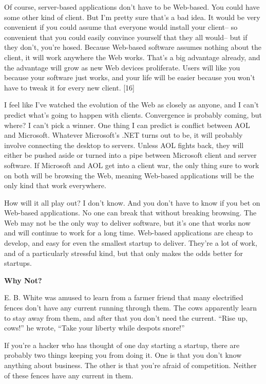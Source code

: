 Of course, server-based applications don't have to be Web-based. You
could have some other kind of client. But I'm pretty sure that's a bad
idea. It would be very convenient if you could assume that everyone
would install your client-- so convenient that you could easily convince
yourself that they all would-- but if they don't, you're hosed. Because
Web-based software assumes nothing about the client, it will work
anywhere the Web works. That's a big advantage already, and the
advantage will grow as new Web devices proliferate. Users will like you
because your software just works, and your life will be easier because
you won't have to tweak it for every new client. {[}16{]}

I feel like I've watched the evolution of the Web as closely as anyone,
and I can't predict what's going to happen with clients. Convergence is
probably coming, but where? I can't pick a winner. One thing I can
predict is conflict between AOL and Microsoft. Whatever Microsoft's .NET
turns out to be, it will probably involve connecting the desktop to
servers. Unless AOL fights back, they will either be pushed aside or
turned into a pipe between Microsoft client and server software. If
Microsoft and AOL get into a client war, the only thing sure to work on
both will be browsing the Web, meaning Web-based applications will be
the only kind that work everywhere.

How will it all play out? I don't know. And you don't have to know if
you bet on Web-based applications. No one can break that without
breaking browsing. The Web may not be the only way to deliver software,
but it's one that works now and will continue to work for a long time.
Web-based applications are cheap to develop, and easy for even the
smallest startup to deliver. They're a lot of work, and of a
particularly stressful kind, but that only makes the odds better for
startups.

\textbf{Why Not?}

E. B. White was amused to learn from a farmer friend that many
electrified fences don't have any current running through them. The cows
apparently learn to stay away from them, and after that you don't need
the current. ``Rise up, cows!'' he wrote, ``Take your liberty while
despots snore!''

If you're a hacker who has thought of one day starting a startup, there
are probably two things keeping you from doing it. One is that you don't
know anything about business. The other is that you're afraid of
competition. Neither of these fences have any current in them.

